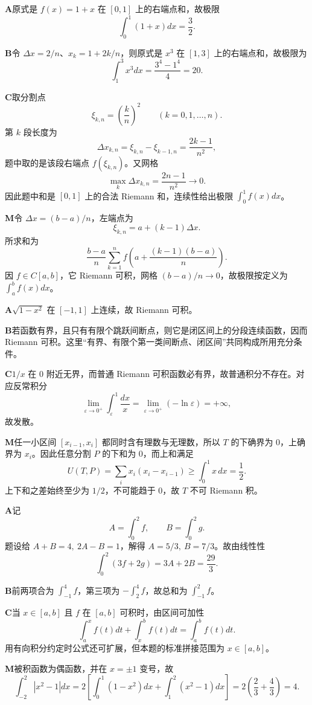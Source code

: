 \begin{solutionBox}
\textbf{A}\quad 原式是 \(f(x)=1+x\) 在 \([0,1]\) 上的右端点和，故极限
\[
\int_0^1(1+x)dx=\frac32.
\]

\textbf{B}\quad 令 \(\Delta x=2/n\)、\(x_k=1+2k/n\)，则原式是 \(x^3\) 在 \([1,3]\) 上的右端点和，故极限为
\[
\int_1^3x^3dx=\frac{3^4-1^4}{4}=20.
\]

\textbf{C}\quad 取分割点
\[
\xi_{k,n}=\left(\frac{k}{n}\right)^2\qquad(k=0,1,\ldots,n).
\]
第 \(k\) 段长度为
\[
\Delta x_{k,n}=\xi_{k,n}-\xi_{k-1,n}=\frac{2k-1}{n^2},
\]
题中取的是该段右端点 \(f(\xi_{k,n})\)。又网格
\[
\max_k\Delta x_{k,n}=\frac{2n-1}{n^2}\to0.
\]
因此题中和是 \([0,1]\) 上的合法 Riemann 和，连续性给出极限 \(\int_0^1f(x)dx\)。

\textbf{M}\quad 令 \(\Delta x=(b-a)/n\)，左端点为
\[
\xi_{k,n}=a+(k-1)\Delta x.
\]
所求和为
\[
\frac{b-a}{n}\sum_{k=1}^nf\!\left(a+\frac{(k-1)(b-a)}n\right).
\]
因 \(f\in C[a,b]\)，它 Riemann 可积，网格 \((b-a)/n\to0\)，故极限按定义为 \(\int_a^bf(x)dx\)。
\end{solutionBox}

\begin{solutionBox}
\textbf{A}\quad \(\sqrt{1-x^2}\) 在 \([-1,1]\) 上连续，故 Riemann 可积。

\textbf{B}\quad 若函数有界，且只有有限个跳跃间断点，则它是闭区间上的分段连续函数，因而 Riemann 可积。这里“有界、有限个第一类间断点、闭区间”共同构成所用充分条件。

\textbf{C}\quad \(1/x\) 在 \(0\) 附近无界，而普通 Riemann 可积函数必有界，故普通积分不存在。对应反常积分
\[
\lim_{\varepsilon\to0^+}\int_\varepsilon^1\frac{dx}{x}
=\lim_{\varepsilon\to0^+}(-\ln\varepsilon)=+\infty,
\]
故发散。

\textbf{M}\quad 任一小区间 \([x_{i-1},x_i]\) 都同时含有理数与无理数，所以 \(T\) 的下确界为 \(0\)，上确界为 \(x_i\)。因此任意分割 \(P\) 的下和为 \(0\)，而上和满足
\[
U(T,P)=\sum_i x_i(x_i-x_{i-1})
\ge\int_0^1x\,dx=\frac12.
\]
上下和之差始终至少为 \(1/2\)，不可能趋于 \(0\)，故 \(T\) 不可 Riemann 积。
\end{solutionBox}

\begin{solutionBox}
\textbf{A}\quad 记
\[
A=\int_0^2f,\qquad B=\int_0^2g.
\]
题设给 \(A+B=4,\ 2A-B=1\)，解得 \(A=5/3,\ B=7/3\)。故由线性性
\[
\int_0^2(3f+2g)=3A+2B=\frac{29}{3}.
\]

\textbf{B}\quad 前两项合为 \(\int_{-1}^4f\)，第三项为 \(-\int_2^4f\)，故总和为 \(\int_{-1}^2f\)。

\textbf{C}\quad 当 \(x\in[a,b]\) 且 \(f\) 在 \([a,b]\) 可积时，由区间可加性
\[
\int_a^xf(t)dt+\int_x^bf(t)dt=\int_a^bf(t)dt.
\]
用有向积分约定时公式还可扩展，但本题的标准拼接范围为 \(x\in[a,b]\)。

\textbf{M}\quad 被积函数为偶函数，并在 \(x=\pm1\) 变号，故
\[
\int_{-2}^2|x^2-1|dx
=2\left[\int_0^1(1-x^2)dx+\int_1^2(x^2-1)dx\right]
=2\left(\frac23+\frac43\right)=4.
\]
\end{solutionBox}

